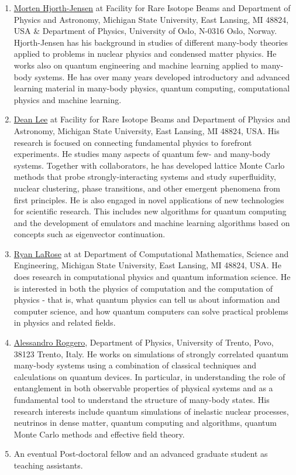 \documentclass[superscriptaddress,amsmath,amssymb,aps,floatfix]{revtex4-2}
\begin{document}
\begin{enumerate}
\item
  \href{http://mhjgit.github.io/info/doc/web/}{Morten Hjorth-Jensen} at
  Facility for Rare Isotope Beams and Department of Physics and
  Astronomy, Michigan State University, East Lansing, MI 48824, USA \&
  Department of Physics, University of Oslo, N-0316 Oslo, Norway. Hjorth-Jensen has his background in studies of different many-body theories applied to problems in nuclear physics and condensed matter physics. He works also on quantum engineering and machine learning applied to many-body systems. He has over many years developed introductory and advanced learning material in many-body physics, quantum computing, computational physics and machine learning.
\item
  \href{https://frib.msu.edu/for-students/faculty/lee-profile}{Dean Lee}
  at Facility for Rare Isotope Beams and Department of Physics and
  Astronomy, Michigan State University, East Lansing, MI 48824, USA. His research is focused on connecting fundamental physics to forefront experiments. He studies many aspects of quantum few- and many-body systems. Together with collaborators, he has developed lattice Monte Carlo methods that probe strongly-interacting systems and study superfluidity, nuclear clustering, phase transitions, and other emergent phenomena from first principles. He  is also engaged in novel applications of new technologies for scientific research. This includes new algorithms for quantum computing and the development of emulators and machine learning algorithms based on concepts such as eigenvector continuation.
\item
  \href{https://www.ryanlarose.com/}{Ryan LaRose} at at Department of
  Computational Mathematics, Science and Engineering, Michigan State
  University, East Lansing, MI 48824, USA. He does research in computational physics and quantum information science. He is  interested in both the physics of computation and the computation of physics - that is, what quantum physics can tell us about information and computer science, and how quantum computers can solve practical problems in physics and related fields.
\item
  \href{https://webapps.unitn.it/du/en/Persona/PER0016084/Didattica}{Alessandro
  Roggero}, Department of Physics, University of Trento, Povo, 38123
  Trento, Italy. He works on  simulations of strongly correlated quantum many-body systems using a combination of classical techniques and calculations on
quantum devices. In particular, in understanding the role of entanglement in both observable properties of physical systems and as a fundamental tool to understand the structure of many-body states. His research interests include quantum simulations of inelastic nuclear processes, neutrinos in dense matter, quantum computing and algorithms, quantum Monte Carlo methods and effective field theory.

\item
  An eventual Post-doctoral fellow and an advanced graduate student as
  teaching assistants.
\end{enumerate}
\end{document}
